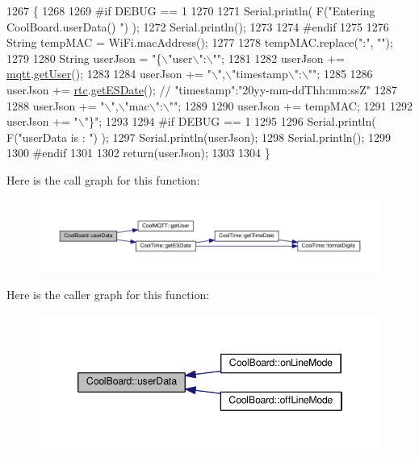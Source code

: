 \begin{DoxyCode}
1267 \{
1268 
1269 \textcolor{preprocessor}{#if DEBUG == 1}
1270 
1271     Serial.println( F(\textcolor{stringliteral}{"Entering CoolBoard.userData() "}) );
1272     Serial.println();
1273 
1274 \textcolor{preprocessor}{#endif}
1275 
1276     String tempMAC = WiFi.macAddress();
1277 
1278     tempMAC.replace(\textcolor{stringliteral}{":"}, \textcolor{stringliteral}{""});
1279 
1280     String userJson = \textcolor{stringliteral}{"\{\(\backslash\)"user\(\backslash\)":\(\backslash\)""};
1281 
1282     userJson += \hyperlink{class_cool_board_a2399f44d7c23c1149a335cb3b46d90f1}{mqtt}.\hyperlink{class_cool_m_q_t_t_a373cc92fca7760d886f02d8a6e5b3f63}{getUser}();
1283 
1284     userJson += \textcolor{stringliteral}{"\(\backslash\)",\(\backslash\)"timestamp\(\backslash\)":\(\backslash\)""};
1285 
1286     userJson += \hyperlink{class_cool_board_a50d2a6716879d64a85f3c6b44ad63275}{rtc}.\hyperlink{class_cool_time_ac4f32ee513c1328d984306645e8785a4}{getESDate}(); \textcolor{comment}{// "timestamp":"20yy-mm-ddThh:mm:ssZ"}
1287 
1288     userJson += \textcolor{stringliteral}{"\(\backslash\)",\(\backslash\)"mac\(\backslash\)":\(\backslash\)""};
1289 
1290     userJson += tempMAC;
1291 
1292     userJson += \textcolor{stringliteral}{"\(\backslash\)"\}"};
1293 
1294 \textcolor{preprocessor}{#if DEBUG == 1}
1295 
1296     Serial.println( F(\textcolor{stringliteral}{"userData is : "}) );
1297     Serial.println(userJson);
1298     Serial.println();
1299 
1300 \textcolor{preprocessor}{#endif  }
1301     
1302     \textcolor{keywordflow}{return}(userJson);
1303     
1304 \}
\end{DoxyCode}
Here is the call graph for this function\+:
\nopagebreak
\begin{figure}[H]
\begin{center}
\leavevmode
\includegraphics[width=350pt]{d7/df9/class_cool_board_ae7358fb6e623cfc81b775f5f1734909b_cgraph}
\end{center}
\end{figure}
Here is the caller graph for this function\+:
\nopagebreak
\begin{figure}[H]
\begin{center}
\leavevmode
\includegraphics[width=346pt]{d7/df9/class_cool_board_ae7358fb6e623cfc81b775f5f1734909b_icgraph}
\end{center}
\end{figure}


